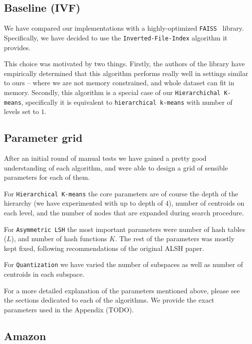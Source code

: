     \subsection{Baseline (IVF)}\label{subsec:baselineivf}

        We have compared our implementations with a highly-optimized \texttt{FAISS}~\cite{faiss} library.
        Specifically, we have decided to use the \texttt{Inverted-File-Index} algorithm it provides.

        This choice was motivated by two things.
        Firstly, the authors of the library have empirically determined that this algorithm performs
        really well in settings similar to ours -- where we are not memory constrained, and whole dataset
        can fit in memory.
        Secondly, this algorithm is a special case of our \texttt{Hierarchichal K-means}, specifically
        it is equivalent to \texttt{hierarchical k-means} with number of levels set to $1$.

    \subsection{Parameter grid}\label{subsec:parameterGrid}

        After an initial round of manual tests we have gained a pretty good understanding of
        each algorithm, and were able to design a grid of sensible parameters for each of them.

        For \texttt{Hierarchical K-means} the core parameters are of course the depth of the hierarchy
        (we have experimented with up to depth of $4$), number of centroids on each level,
        and the number of nodes that are expanded during search procedure.

        For \texttt{Asymmetric LSH} the most important parameters were number of hash tables ($L$),
        and number of hash functions $K$. The rest of the parameters was mostly kept fixed, following
        recommendations of the original ALSH paper.

        For \texttt{Quantization} we have varied the number of subspaces as well as number of centroids
        in each subspace.

        For a more detailed explanation of the parameters mentioned above, please see the sections
        dedicated to each of the algorithms.
        We provide the exact parameters used in the Appendix (TODO).

    \subsection{Amazon}

